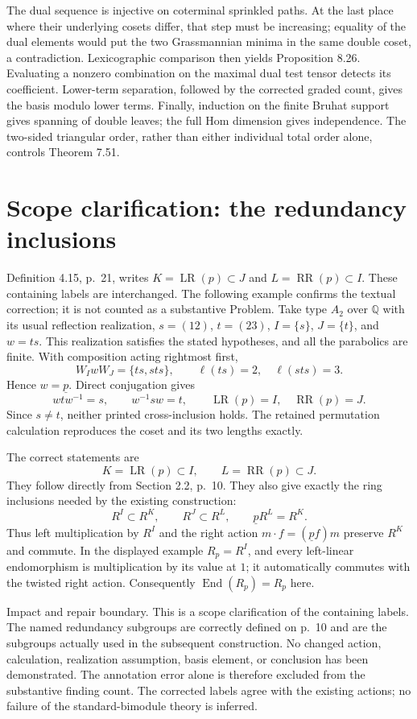 \documentclass[10pt]{article}
\begin{document}
The dual sequence is injective on coterminal sprinkled paths. At the last place where their underlying cosets differ, that step must be increasing; equality of the dual elements would put the two Grassmannian minima in the same double coset, a contradiction. Lexicographic comparison then yields Proposition 8.26. Evaluating a nonzero combination on the maximal dual test tensor detects its coefficient. Lower-term separation, followed by the corrected graded count, gives the basis modulo lower terms. Finally, induction on the finite Bruhat support gives spanning of double leaves; the full Hom dimension gives independence. The two-sided triangular order, rather than either individual total order alone, controls Theorem 7.51.\par
\section*{Scope clarification: the redundancy inclusions}
Definition 4.15, p. 21, writes \(K=\operatorname{LR}(p)\subset J\) and \(L=\operatorname{RR}(p)\subset I\). These containing labels are interchanged. The following example confirms the textual correction; it is not counted as a substantive Problem. Take type \(A_2\) over \(\mathbb Q\) with its usual reflection realization, \(s=(12)\), \(t=(23)\), \(I=\{s\}\), \(J=\{t\}\), and \(w=ts\). This realization satisfies the stated hypotheses, and all the parabolics are finite. With composition acting rightmost first, \[W_IwW_J=\{ts,sts\},\qquad \ell(ts)=2,\quad\ell(sts)=3.\] Hence \(w=\underline p\). Direct conjugation gives \[wtw^{-1}=s,\qquad w^{-1}sw=t,
 \qquad
 \operatorname{LR}(p)=I,\quad \operatorname{RR}(p)=J.\] Since \(s\ne t\), neither printed cross-inclusion holds. The retained permutation calculation reproduces the coset and its two lengths exactly.\par
The correct statements are \[K=\operatorname{LR}(p)\subset I,\qquad L=\operatorname{RR}(p)\subset J.\] They follow directly from Section 2.2, p. 10. They also give exactly the ring inclusions needed by the existing construction: \[R^I\subset R^K,\qquad
 R^J\subset R^L,\qquad
 \underline p R^L=R^K.\] Thus left multiplication by \(R^I\) and the right action \(m\cdot f=(\underline p f)m\) preserve \(R^K\) and commute. In the displayed example \(R_p=R^I\), and every left-linear endomorphism is multiplication by its value at \(1\); it automatically commutes with the twisted right action. Consequently \(\operatorname{End}(R_p)=R_p\) here.\par
Impact and repair boundary. This is a scope clarification of the containing labels. The named redundancy subgroups are correctly defined on p. 10 and are the subgroups actually used in the subsequent construction. No changed action, calculation, realization assumption, basis element, or conclusion has been demonstrated. The annotation error alone is therefore excluded from the substantive finding count. The corrected labels agree with the existing actions; no failure of the standard-bimodule theory is inferred.\par
\end{document}
